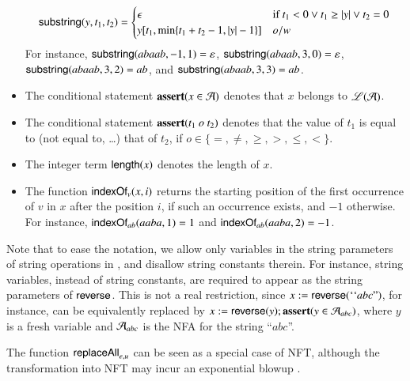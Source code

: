 \begin{itemize}
\[ \mathsf{substring}(y, t_1, t_2)=
\begin{cases}
\epsilon & \mbox{if }t_1<0\vee t_1 \ge |y| \vee t_2=0 \\
y[t_1, \min\{t_1+t_2-1, |y|-1\}] & o/w
\end{cases}
\]
For instance, $\mathsf{substring}(abaab, -1,1)=\varepsilon$, $\mathsf{substring}(abaab, 3,0)=\varepsilon$, $\mathsf{substring}(abaab, 3,2)=ab$, and $\mathsf{substring}(abaab, 3,3)=ab$.
%
\item The conditional statement $\textbf{assert}(x \in \mathcal{A})$ denotes that $x$ belongs to $\mathscr{L}(\mathcal{A})$.
%
\item The conditional statement $\textbf{assert}(t_1 \ o\ t_2)$ denotes that the value of $t_1$ is equal to (not equal to, \dots) that of $t_2$, if $o\in \{ =, \neq, \geq, >, \leq, < \}$.
%
\item The integer term $\mathsf{length}(x)$ denotes the length of $x$. 
%
\item The function $\mathsf{indexOf}_v(x, i)$ returns the starting position of the first occurrence of $v$ in $x$ after the position $i$, if such an occurrence exists, and $-1$ otherwise. For instance, $\mathsf{indexOf}_{ab}(aaba, 1) = 1$ and $\mathsf{indexOf}_{ab}(aaba, 2)=-1$.
\end{itemize}

\begin{remark}
Note that to ease the notation, we allow only variables in the string parameters of string operations in {\slint}, and disallow string constants therein. For instance, string variables, instead of string constants, are required to appear as the string parameters of $\mathsf{reverse}$. This is not a real restriction, since $x:=\mathsf{reverse}({\mbox``}abc\mbox{''})$, for instance, can be equivalently replaced by $x:=\mathsf{reverse}(y); \textbf{assert}(y \in \mathcal{A}_{abc})$, where $y$ is a fresh variable and $\mathcal{A}_{abc}$ is the NFA for the string ``$abc$''.
\end{remark}


\begin{remark}
The function $\mathsf{replaceAll}_{e,u}$ can be seen as a special case of NFT, although the transformation into NFT may incur an exponential blowup \cite{CCH+18}.
\end{remark}


